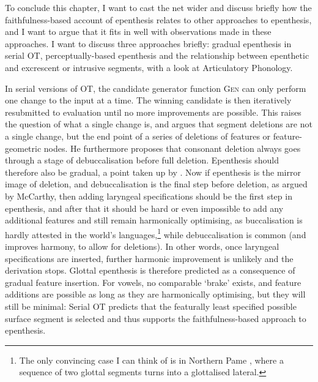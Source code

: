 \documentclass[output=paper,colorlinks,citecolor=brown]{langscibook}
\begin{document}
To conclude this chapter, I want to cast the net wider and discuss briefly how the faithfulness-based account of epenthesis relates to other approaches to epenthesis, and I want to argue that it fits in well with observations made in these approaches. I want to discuss three approaches briefly: gradual epenthesis in serial OT, perceptually-based epenthesis and the relationship between epenthetic and excrescent or intrusive segments, with a look at Articulatory Phonology.

In serial versions of OT, the candidate generator function \textsc{Gen} can only perform one change to the input at a time. The winning candidate is then iteratively resubmitted to evaluation until no more improvements are possible. This raises the question of what a single change is, and \citet{jjm08, jjm18} argues that segment deletions are not a single change, but the end point of a series of deletions of features or feature-geometric nodes. He furthermore proposes that consonant deletion always goes through a stage of debuccalisation before full deletion. Epenthesis should therefore also be gradual, a point taken up by \citet{almohanna21}. Now if epenthesis is the mirror image of deletion, and debuccalisation is the final step before deletion, as argued by McCarthy, then adding laryngeal specifications should be the first step in epenthesis, and after that it should be hard or even impossible to add any additional features and still remain harmonically optimising, as buccalisation is hardly attested in the world's languages,\footnote{The only convincing case I can think of is in Northern Pame \citep[226]{berthiaume-phd}, where a sequence of two glottal segments turns into a glottalised lateral.} while debuccalisation is common (and improves harmony, to allow for deletions). In other words, once laryngeal specifications are inserted, further harmonic improvement is unlikely and the derivation stops. Glottal epenthesis is therefore predicted as a consequence of gradual feature insertion. For vowels, no comparable `brake' exists, and feature additions are possible as long as they are harmonically optimising, but they will still be minimal: Serial OT predicts that the featurally least specified possible surface segment is selected and thus supports the faithfulness-based approach to epenthesis.
\end{document}
